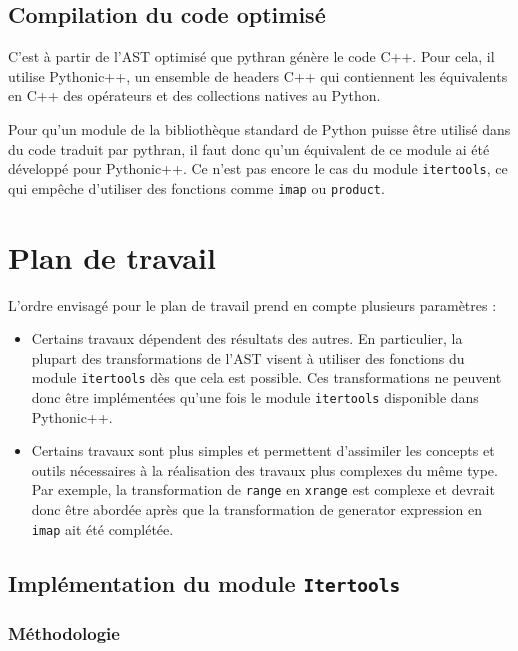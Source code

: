 \documentclass[a4paper]{article}
\begin{document}
\subsection{Compilation du code optimisé}

\label{Pythonicpp}

C'est à partir de l'AST optimisé que pythran génère le code C++. Pour
cela, il utilise Pythonic++, un ensemble de headers C++ qui
contiennent les équivalents en C++ des opérateurs et des collections
natives au Python.

Pour qu'un module de la bibliothèque standard de Python puisse être
utilisé dans du code traduit par pythran, il faut donc qu'un
équivalent de ce module ai été développé pour Pythonic++. Ce n'est pas
encore le cas du module \texttt{itertools}, ce qui empêche d'utiliser des
fonctions comme \texttt{imap} ou \texttt{product}.

\section{Plan de travail}

L'ordre envisagé pour le plan de travail prend en compte plusieurs
paramètres :

\begin{itemize}
\item Certains travaux dépendent des résultats des autres. En
  particulier, la plupart des transformations de l'AST visent à
  utiliser des fonctions du module \texttt{itertools} dès que cela est
  possible. Ces transformations ne peuvent donc être implémentées
  qu'une fois le module \texttt{itertools} disponible dans Pythonic++.
\item Certains travaux sont plus simples et permettent d'assimiler les
  concepts et outils nécessaires à la réalisation des travaux plus
  complexes du même type. Par exemple, la transformation de
  \texttt{range} en \texttt{xrange} est complexe et devrait donc être
  abordée après que la transformation de generator expression en
  \texttt{imap} ait été complétée.
\end{itemize}

\subsection{Implémentation du module \texttt{Itertools}}

\subsubsection{Méthodologie}
\end{document}
